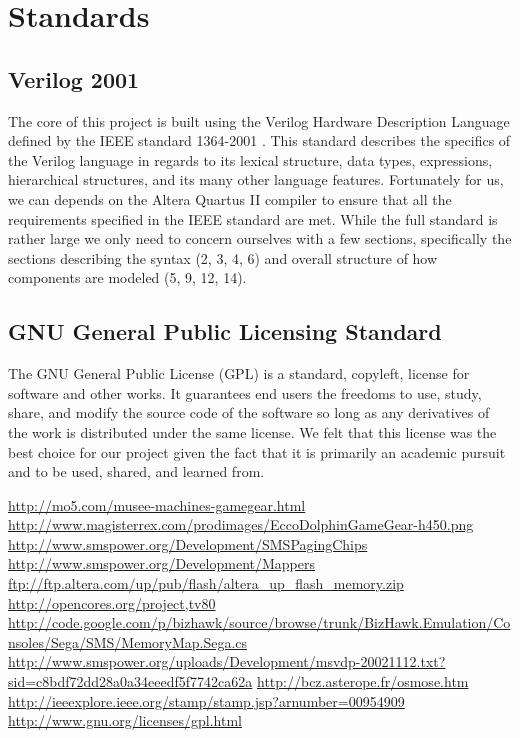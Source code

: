 \documentclass{article}
\begin{document}
\newpage
\section{Standards}
\subsection{Verilog 2001}

The core of this project is built using the Verilog Hardware Description
Language defined by the IEEE standard 1364-2001 \cite{ieeeverilog}. This
standard describes the specifics of the Verilog language in regards to its
lexical structure, data types, expressions, hierarchical structures, and its
many other language features.  Fortunately for us, we can depends on the Altera
Quartus II compiler to ensure that all the requirements specified in the IEEE
standard are met. While the full standard is rather large we only need to
concern ourselves with a few sections, specifically the sections describing the
syntax (2, 3, 4, 6) and overall structure of how components are modeled (5, 9,
12, 14).

\subsection{GNU General Public Licensing Standard}

The GNU General Public License (GPL) \cite{gpl} is a standard, copyleft,
license for software and other works.  It guarantees end users the freedoms to
use, study, share, and modify the source code of the software so long as any
derivatives of the work is distributed under the same license. We felt that
this license was the best choice for our project given the fact that it is
primarily an academic pursuit and to be used, shared, and learned from.

\newpage
\begin{thebibliography}{9}
     \url{http://mo5.com/musee-machines-gamegear.html}
     \url{http://www.magisterrex.com/prodimages/EccoDolphinGameGear-h450.png}
     \url{http://www.smspower.org/Development/SMSPagingChips}
     \url{http://www.smspower.org/Development/Mappers}
     \url{ftp://ftp.altera.com/up/pub/flash/altera_up_flash_memory.zip}
     \url{http://opencores.org/project,tv80}
     \url{http://code.google.com/p/bizhawk/source/browse/trunk/BizHawk.Emulation/Consoles/Sega/SMS/MemoryMap.Sega.cs}
     \url{http://www.smspower.org/uploads/Development/msvdp-20021112.txt?sid=c8bdf72dd28a0a34eeedf5f7742ca62a}
     \url{http://bcz.asterope.fr/osmose.htm}
     \url{http://ieeexplore.ieee.org/stamp/stamp.jsp?arnumber=00954909}
     \url{http://www.gnu.org/licenses/gpl.html}
\end{thebibliography}
\end{document}
